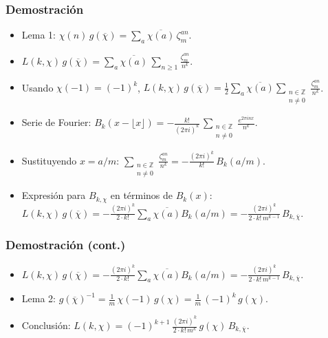 \documentclass{beamer}
\begin{document}
\begin{frame}
  \frametitle{Demostración}

  \begin{itemize}
  \item<1-> Lema 1: $\chi (n)\,g (\overline{\chi}) = \sum_a \overline{\chi (a)}\,\zeta^{an}_m$.

  \item<2-> $L (k,\chi)\,g (\overline{\chi}) = \sum_a \overline{\chi (a)} \, \sum_{n\ge 1} \frac{\zeta_m^{an}}{n^k}$.

  \item<3-> Usando $\chi (-1) = (-1)^k$,
    $L (k,\chi)\,g (\overline{\chi}) = \frac{1}{2} \sum_a \overline{\chi (a)} \sum_{\substack{n \in \mathbb{Z} \\ n \ne 0}} \frac{\zeta_m^{an}}{n^k}$.

  \item<4-> Serie de Fourier: $B_k (x - \lfloor x\rfloor) = -\frac{k!}{(2\pi i)^k} \, \sum_{\substack{n \in \mathbb{Z} \\ n \ne 0}} \frac{e^{2\pi i n x}}{n^k}$.

  \item<5-> Sustituyendo $x = a/m$:
    $\sum_{\substack{n \in \mathbb{Z} \\ n \ne 0}} \frac{\zeta_m^{an}}{n^k} = -\frac{(2\pi i)^k}{k!}\,B_k (a/m)$.

  \item<6-> Expresión para $B_{k,\chi}$ en términos de $B_k (x)$:
    $L (k,\chi)\,g (\overline{\chi}) = -\frac{(2\pi i)^k}{2\cdot k!} \sum_a \overline{\chi (a)} B_k (a/m) = -\frac{(2\pi i)^k}{2\cdot k!\,m^{k-1}}\,B_{k,\overline{\chi}}$.
  \end{itemize}
\end{frame}


\begin{frame}
  \frametitle{Demostración (cont.)}

  \begin{itemize}
  \item<1->
    $L (k,\chi)\,g (\overline{\chi}) = -\frac{(2\pi i)^k}{2\cdot k!} \sum_a \overline{\chi (a)} B_k (a/m) = -\frac{(2\pi i)^k}{2\cdot k!\,m^{k-1}}\,B_{k,\overline{\chi}}$.

    \item<2-> Lema 2: $g (\overline{\chi})^{-1} = \frac{1}{m}\,\chi (-1)\,g (\chi) = \frac{1}{m}\,(-1)^k\,g (\chi)$.

    \item<3-> Conclusión:
      $L (k,\chi) = (-1)^{k+1}\,\frac{(2\pi i)^k}{2\cdot k!\,m^k}\,g (\chi)\,B_{k,\overline{\chi}}$.
  \end{itemize}
\end{frame}
\end{document}
